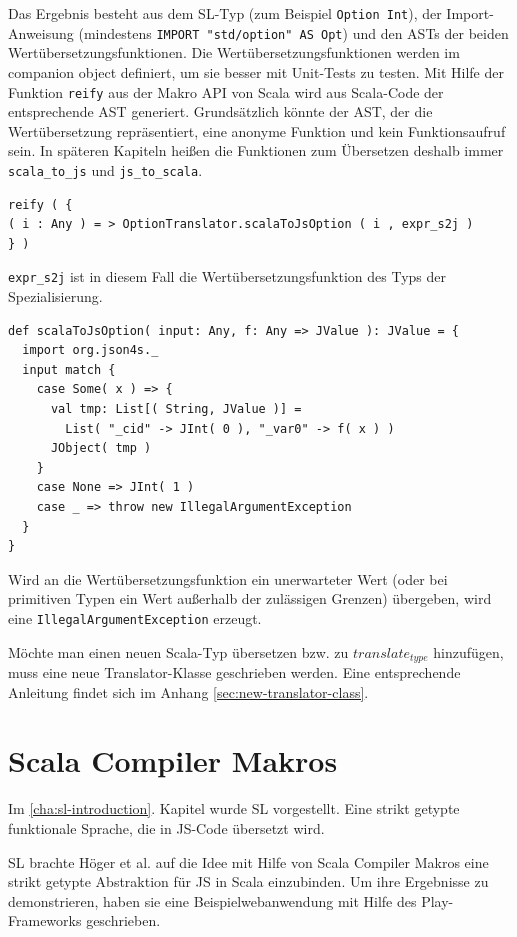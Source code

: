 \documentclass[12pt,bibtotoc]{scrreprt}
\begin{document}
Das Ergebnis besteht aus dem SL-Typ (zum Beispiel \lstinline!Option Int!), der Import-Anweisung (mindestens \lstinline!IMPORT "std/option" AS Opt!) und den ASTs der beiden Wertübersetzungsfunktionen. Die Wertübersetzungsfunktionen werden im companion object definiert, um sie besser mit Unit-Tests zu testen. Mit Hilfe der Funktion \lstinline!reify! aus der Makro API von Scala wird aus Scala-Code der entsprechende AST generiert. Grundsätzlich könnte der AST, der die Wertübersetzung repräsentiert, eine anonyme Funktion und kein Funktionsaufruf sein. In späteren Kapiteln heißen die Funktionen zum Übersetzen deshalb immer \lstinline!scala_to_js! und \lstinline!js_to_scala!.

\begin{lstlisting}
reify ( {
( i : Any ) = > OptionTranslator.scalaToJsOption ( i , expr_s2j )
} )
\end{lstlisting}

\lstinline!expr_s2j! ist in diesem Fall die Wertübersetzungsfunktion des Typs der Spezialisierung. 

\begin{lstlisting}
def scalaToJsOption( input: Any, f: Any => JValue ): JValue = {
  import org.json4s._
  input match {
    case Some( x ) => {
      val tmp: List[( String, JValue )] = 
        List( "_cid" -> JInt( 0 ), "_var0" -> f( x ) )
      JObject( tmp )
    }
    case None => JInt( 1 )
    case _ => throw new IllegalArgumentException
  }
}
\end{lstlisting}

Wird an die Wertübersetzungsfunktion ein unerwarteter Wert (oder bei primitiven Typen ein Wert außerhalb der zulässigen Grenzen) übergeben, wird eine \lstinline!IllegalArgumentException! erzeugt.

Möchte man einen neuen Scala-Typ übersetzen bzw. zu $translate_{type}$ hinzufügen, muss eine neue Translator-Klasse geschrieben werden. Eine entsprechende Anleitung findet sich im Anhang \ref{sec:new-translator-class}.

\chapter{Scala Compiler Makros}
\label{chap:scala-compiler-macros}

Im \ref{cha:sl-introduction}. Kapitel wurde SL vorgestellt. Eine strikt getypte funktionale Sprache, die in JS-Code übersetzt wird.

SL brachte Höger et al. auf die Idee mit Hilfe von Scala Compiler Makros eine strikt getypte Abstraktion für JS in Scala einzubinden\cite{Hoger2013}. Um ihre Ergebnisse zu demonstrieren, haben sie eine Beispielwebanwendung mit Hilfe des Play-Frameworks\cite{Play1} geschrieben. 
\end{document}

